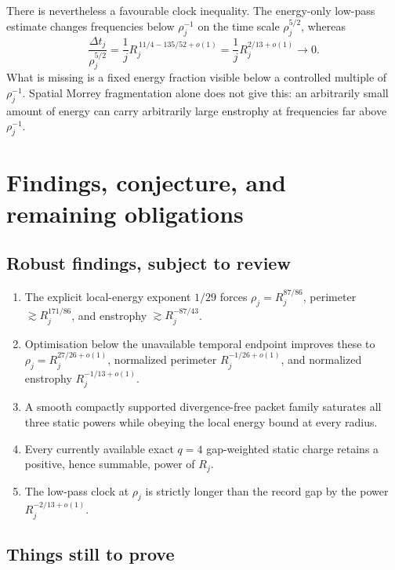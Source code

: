 \documentclass[11pt]{article}
\theoremstyle{remark}
\begin{document}
There is nevertheless a favourable clock inequality.  The energy-only
low-pass estimate changes frequencies below \(\rho_j^{-1}\) on the time
scale \(\rho_j^{5/2}\), whereas
\begin{equation}
 \label{eq:lowpass-gap}
 \frac{\Delta t_j}{\rho_j^{5/2}}
 =
 \frac1jR_j^{\,11/4-135/52+o(1)}
 =
 \frac1jR_j^{2/13+o(1)}
 \longrightarrow0.
\end{equation}
What is missing is a fixed energy fraction visible below a controlled
multiple of \(\rho_j^{-1}\).  Spatial Morrey fragmentation alone does not
give this: an arbitrarily small amount of energy can carry arbitrarily
large enstrophy at frequencies far above \(\rho_j^{-1}\).

\section{Findings, conjecture, and remaining obligations}

\subsection*{Robust findings, subject to review}

\begin{enumerate}
\item The explicit local-energy exponent \(1/29\) forces
\(\rho_j=R_j^{87/86}\), perimeter
\(\gtrsim R_j^{171/86}\), and enstrophy
\(\gtrsim R_j^{-87/43}\).
\item Optimisation below the unavailable temporal endpoint improves these
to \(\rho_j=R_j^{27/26+o(1)}\), normalized perimeter
\(R_j^{-1/26+o(1)}\), and normalized enstrophy
\(R_j^{-1/13+o(1)}\).
\item A smooth compactly supported divergence-free packet family saturates
all three static powers while obeying the local energy bound at every
radius.
\item Every currently available exact \(q=4\) gap-weighted static charge
retains a positive, hence summable, power of \(R_j\).
\item The low-pass clock at \(\rho_j\) is strictly longer than the record
gap by the power \(R_j^{-2/13+o(1)}\).
\end{enumerate}

\subsection*{Things still to prove}
\end{document}
